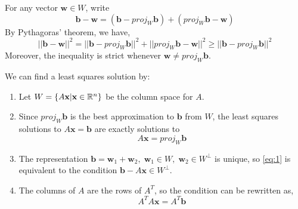 {For any vector \(\mathbf{w} \in W\), write
\begin{equation}
    \mathbf{b} - \mathbf{w} = (\mathbf{b} - proj_W\mathbf{b}) + (proj_W\mathbf{b} - \mathbf{w})
\end{equation}
By Pythagoras' theorem, we have,
\begin{equation}
    ||\mathbf{b} - \mathbf{w}||^2 = ||\mathbf{b} - proj_W\mathbf{b}||^2 + ||proj_W\mathbf{b} - \mathbf{w}||^2 \geq ||\mathbf{b} - proj_W\mathbf{b}||^2
\end{equation}
Moreover, the inequality is strict whenever \(\mathbf{w} \neq proj_W\mathbf{b}\).}

We can find a least squares solution by:
\begin{enumerate}
    \item Let \(W = \{A\mathbf{x} | \mathbf{x} \in \mathbb{R}^n\}\) be the column space for \(A\).
    \item Since \(proj_W\mathbf{b}\) is the best approximation to \(\mathbf{b}\) from \(W\), the least squares solutions to \(A\mathbf{x} = \mathbf{b}\) are exactly solutions to 
    \begin{equation}\label{eq:1}
        A\mathbf{x} = proj_W\mathbf{b}
    \end{equation}
    \item The representation \(\mathbf{b} = \mathbf{w}_1 + \mathbf{w}_2,\; \mathbf{w}_1 \in W,\; \mathbf{w}_2 \in W^\perp\) is unique, so \eqref{eq:1} is equivalent to the condition \(\mathbf{b} - A\mathbf{x} \in W^\perp\).
    \item The columns of \(A\) are the rows of \(A^T\), so the condition can be rewritten as,
    \begin{equation}
        A^TA\mathbf{x} = A^T\mathbf{b}
    \end{equation}
\end{enumerate}

